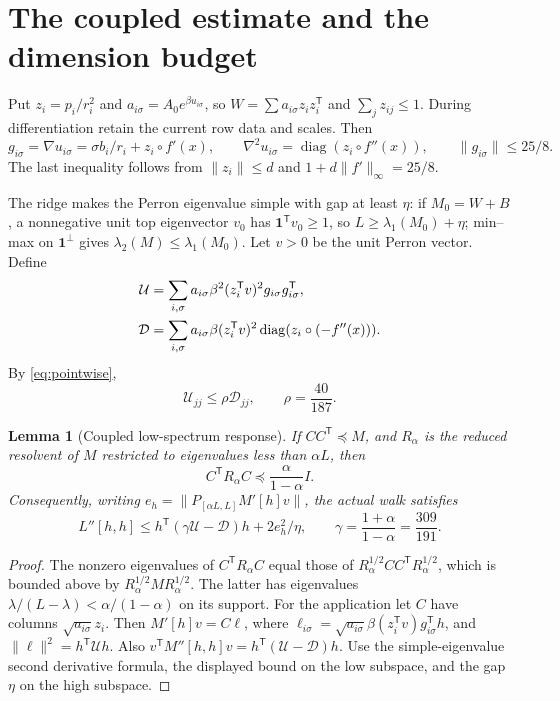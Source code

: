 \documentclass[11pt]{amsart}
\newtheorem{lemma}[theorem]{Lemma}
\theoremstyle{remark}\newtheorem{remark}[theorem]{Remark}
\newcommand{\diag}{\operatorname{diag}}
\newcommand{\one}{\mathbf 1}
\newcommand{\T}{\mathsf T}
\newcommand{\calU}{\mathcal U}
\newcommand{\calD}{\mathcal D}
\begin{document}
\section{The coupled estimate and the dimension budget}\label{sec:coupling}

Put $z_i=p_i/r_i^2$ and $a_{i\sigma}=A_0e^{\beta u_{i\sigma}}$, so
$W=\sum a_{i\sigma}z_iz_i^\T$ and $\sum_jz_{ij}\le1$.
During differentiation retain the current row data and scales. Then
\[
 g_{i\sigma}=\nabla u_{i\sigma}
 =\sigma b_i/r_i+z_i\circ f'(x),\qquad
 \nabla^2u_{i\sigma}=\diag(z_i\circ f''(x)),\qquad
 \|g_{i\sigma}\|\le25/8.
\]
The last inequality follows from $\|z_i\|\le d$ and
$1+d\|f'\|_\infty=25/8$.

The ridge makes the Perron eigenvalue simple with gap at least $\eta$:
if $M_0=W+B$, a nonnegative unit top eigenvector $v_0$ has
$\one^\T v_0\ge1$, so $L\ge\lambda_1(M_0)+\eta$; min--max on
$\one^\perp$ gives $\lambda_2(M)\le\lambda_1(M_0)$.
Let $v>0$ be the unit Perron vector. Define
\begin{align}\label{eq:UD}
 \calU&=\sum_{i,\sigma}a_{i\sigma}\beta^2(z_i^\T v)^2
                                  g_{i\sigma}g_{i\sigma}^\T,\notag\\
 \calD&=\sum_{i,\sigma}a_{i\sigma}\beta(z_i^\T v)^2
                    \diag(z_i\circ(-f''(x))).
\end{align}
By \eqref{eq:pointwise},
\begin{equation}\label{eq:rho}
 \calU_{jj}\le\rho\calD_{jj},\qquad \rho=\frac{40}{187}.
\end{equation}

\begin{lemma}[Coupled low-spectrum response]\label{lem:coupled}
If $CC^\T\preceq M$, and $R_\alpha$ is the reduced resolvent of $M$
restricted to eigenvalues less than $\alpha L$, then
\[
 C^\T R_\alpha C\preceq\frac{\alpha}{1-\alpha}I.
\]
Consequently, writing $e_h=\|P_{[\alpha L,L]}M'[h]v\|$, the actual walk
satisfies
\begin{equation}\label{eq:curvature}
 L''[h,h]\le h^\T(\gamma\calU-\calD)h+2e_h^2/\eta,
 \qquad \gamma=\frac{1+\alpha}{1-\alpha}=\frac{309}{191}.
\end{equation}
\end{lemma}
\begin{proof}
The nonzero eigenvalues of $C^\T R_\alpha C$ equal those of
$R_\alpha^{1/2}CC^\T R_\alpha^{1/2}$, which is bounded above by
$R_\alpha^{1/2}MR_\alpha^{1/2}$. The latter has eigenvalues
$\lambda/(L-\lambda)<\alpha/(1-\alpha)$ on its support.
For the application let $C$ have columns $\sqrt{a_{i\sigma}}z_i$.
Then $M'[h]v=C\ell$, where
$\ell_{i\sigma}=\sqrt{a_{i\sigma}}\beta(z_i^\T v)g_{i\sigma}^\T h$,
and $\|\ell\|^2=h^\T\calU h$.
Also $v^\T M''[h,h]v=h^\T(\calU-\calD)h$.
Use the simple-eigenvalue second derivative formula, the displayed bound
on the low subspace, and the gap $\eta$ on the high subspace.
\end{proof}
\end{document}
